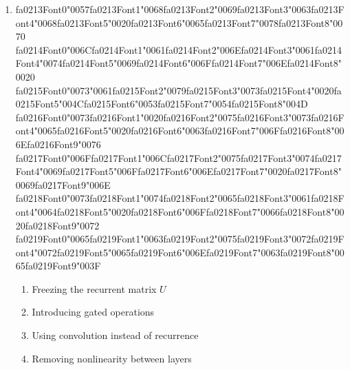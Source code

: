 \documentclass[12pt]{article}
\begin{document}
\begin{enumerate}[label=Q\arabic*.]
 \item {\csname fa0213Font0\endcsname\char"0057}{\csname fa0213Font1\endcsname\char"0068}{\csname fa0213Font2\endcsname\char"0069}{\csname fa0213Font3\endcsname\char"0063}{\csname fa0213Font4\endcsname\char"0068}{\csname fa0213Font5\endcsname\char"0020}{\csname fa0213Font6\endcsname\char"0065}{\csname fa0213Font7\endcsname\char"0078}{\csname fa0213Font8\endcsname\char"0070} {\csname fa0214Font0\endcsname\char"006C}{\csname fa0214Font1\endcsname\char"0061}{\csname fa0214Font2\endcsname\char"006E}{\csname fa0214Font3\endcsname\char"0061}{\csname fa0214Font4\endcsname\char"0074}{\csname fa0214Font5\endcsname\char"0069}{\csname fa0214Font6\endcsname\char"006F}{\csname fa0214Font7\endcsname\char"006E}{\csname fa0214Font8\endcsname\char"0020} {\csname fa0215Font0\endcsname\char"0073}{\char"0061}{\csname fa0215Font2\endcsname\char"0079}{\csname fa0215Font3\endcsname\char"0073}{\csname fa0215Font4\endcsname\char"0020}{\csname fa0215Font5\endcsname\char"004C}{\csname fa0215Font6\endcsname\char"0053}{\csname fa0215Font7\endcsname\char"0054}{\csname fa0215Font8\endcsname\char"004D} {\csname fa0216Font0\endcsname\char"0073}{\csname fa0216Font1\endcsname\char"0020}{\csname fa0216Font2\endcsname\char"0075}{\csname fa0216Font3\endcsname\char"0073}{\csname fa0216Font4\endcsname\char"0065}{\csname fa0216Font5\endcsname\char"0020}{\csname fa0216Font6\endcsname\char"0063}{\csname fa0216Font7\endcsname\char"006F}{\csname fa0216Font8\endcsname\char"006E}{\csname fa0216Font9\endcsname\char"0076} {\csname fa0217Font0\endcsname\char"006F}{\csname fa0217Font1\endcsname\char"006C}{\csname fa0217Font2\endcsname\char"0075}{\csname fa0217Font3\endcsname\char"0074}{\csname fa0217Font4\endcsname\char"0069}{\csname fa0217Font5\endcsname\char"006F}{\csname fa0217Font6\endcsname\char"006E}{\csname fa0217Font7\endcsname\char"0020}{\csname fa0217Font8\endcsname\char"0069}{\csname fa0217Font9\endcsname\char"006E} {\csname fa0218Font0\endcsname\char"0073}{\csname fa0218Font1\endcsname\char"0074}{\csname fa0218Font2\endcsname\char"0065}{\csname fa0218Font3\endcsname\char"0061}{\csname fa0218Font4\endcsname\char"0064}{\csname fa0218Font5\endcsname\char"0020}{\csname fa0218Font6\endcsname\char"006F}{\csname fa0218Font7\endcsname\char"0066}{\csname fa0218Font8\endcsname\char"0020}{\csname fa0218Font9\endcsname\char"0072} {\csname fa0219Font0\endcsname\char"0065}{\csname fa0219Font1\endcsname\char"0063}{\csname fa0219Font2\endcsname\char"0075}{\csname fa0219Font3\endcsname\char"0072}{\csname fa0219Font4\endcsname\char"0072}{\csname fa0219Font5\endcsname\char"0065}{\csname fa0219Font6\endcsname\char"006E}{\csname fa0219Font7\endcsname\char"0063}{\csname fa0219Font8\endcsname\char"0065}{\csname fa0219Font9\endcsname\char"003F}
 \begin{enumerate}[label=(\Alph*)]
     \item Freezing the recurrent matrix $U$
     \item Introducing gated operations
     \item Using convolution instead of recurrence
     \item Removing nonlinearity between layers
 \end{enumerate}
 

\end{enumerate}
\end{document}
